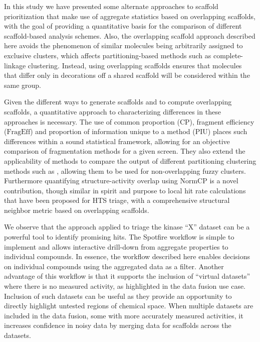 \documentclass[journal=jacsat,biochem,manuscript=article]{achemso}
\newcommand*\fref[1]{Figure~\ref{fig:#1}}
\begin{document}
In this study we have presented some alternate approaches to scaffold
prioritization that make use of aggregate statistics based on
overlapping scaffolds, with the goal of providing a quantitative basis
for the comparison of different scaffold-based analysis schemes.
Also, the overlapping scaffold approach described here
avoids the phenomenon of similar molecules being arbitrarily assigned to
exclusive clusters, which affects partitioning-based methods such as
complete-linkage clustering.%
Instead, using overlapping scaffolds ensures that
molecules that differ only in decorations off a shared scaffold
will be considered within the same group.

Given the different ways to generate scaffolds and to compute
overlapping scaffolds, a quantitative approach to characterizing
differences in these approaches is necessary. The use of common
proportion ($\textrm{CP}$), fragment efficiency ($\textrm{FragEff}$)
and proportion of information unique to a method ($\textrm{PIU}$) 
places such differences within a sound statistical framework, allowing
for an objective comparison of fragmentation methods for a given
screen. They also extend the applicability of
methods to compare the output of different partitioning clustering
methods such as \citet{Torres2009}, allowing them to be used for
non-overlapping fuzzy clusters. Furthermore quantifying
structure-activity overlap using $\textrm{NormCP}$ is a novel
contribution, though similar in spirit and purpose to local hit rate
calculations that have been proposed for HTS triage\cite{Posner2009},
with a comprehensive structural neighbor metric based on overlapping
scaffolds.

We observe that the approach applied to triage the kinase ``X'' dataset
can be a powerful tool to identify promising hits.  The Spotfire workflow
is simple to implement and allows interactive drill-down from
aggregate properties to individual compounds. In essence,
the workflow described here enables decisions on individual compounds
using the aggregated data as a filter. Another advantage of this
workflow is that it supports the inclusion of ``virtual
datasets'' where there is no measured activity, as highlighted in the
data fusion use case.  Inclusion of such datasets can be useful as
they provide an opportunity to directly highlight untested regions of
chemical space. When multiple datasets are included in the data fusion, 
some with more accurately measured activities, it increases
confidence in noisy data by merging data for scaffolds across the
datasets.
\end{document}
